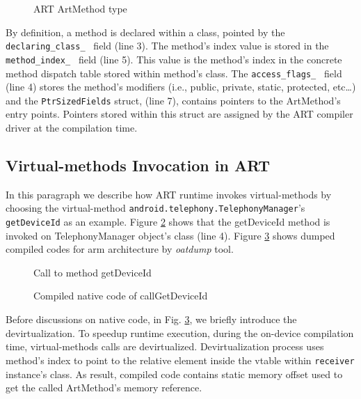 \begin{figure}[h!]

\caption{ART ArtMethod type}
\label{art:artmethod}
\end{figure}

By definition, a method is declared within a class, pointed by the {\tt declaring\_class\_ } field (line 3). The method's index value is stored in the {\tt method\_index\_ } field (line 5). This value is the method's index in the concrete method dispatch table stored within method's class. The {\tt access\_flags\_ } field (line 4) stores the method's modifiers (i.e., public, private, static, protected, etc\ldots) and the {\tt PtrSizedFields} struct, (line 7), contains pointers to the ArtMethod's entry points. Pointers stored within this struct are assigned by the ART compiler driver at the compilation time. 


\subsection{Virtual-methods Invocation in ART}
\label{subsub:artinvoke}
In this paragraph we describe how ART runtime invokes virtual-methods by choosing the virtual-method {\tt android.telephony.TelephonyManager}'s {\tt getDeviceId} as an example. Figure \ref{fig:es1} shows that the getDeviceId method is invoked on TelephonyManager object's class (line 4). Figure \ref{fig:oatdump} shows dumped compiled codes for arm architecture by \textit{oatdump} tool. 


\begin{figure}[h!]

\caption{Call to method getDeviceId} 
\label{fig:es1}
\end{figure}

\begin{figure}[h!]

\caption{Compiled native code of callGetDeviceId}
\label{fig:oatdump}
\end{figure}


Before discussions on native code, in Fig. \ref{fig:oatdump}, we briefly introduce the devirtualization. To speedup runtime execution, during the on-device compilation time, virtual-methods calls are devirtualized. Devirtualization process uses method's index to point to the relative element inside the vtable within {\tt receiver} instance's class.  As result, compiled code contains static memory offset used to get the called ArtMethod's memory reference. 
 

